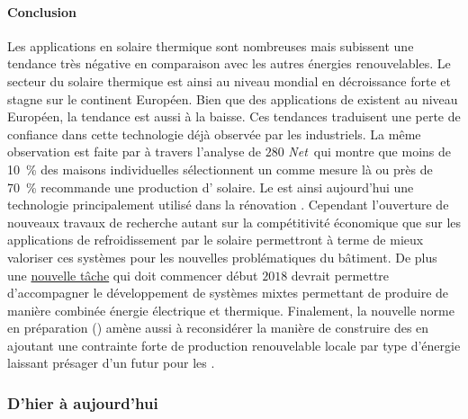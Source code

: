 \paragraph{Conclusion} %
\label{par:conclusion}
Les applications en solaire thermique sont nombreuses mais subissent
une tendance très négative en comparaison avec les autres énergies renouvelables. Le
secteur du solaire thermique est ainsi au niveau mondial en décroissance forte et stagne
sur le continent Européen. Bien que des applications de  existent au niveau
Européen, la tendance est aussi à la baisse. Ces tendances traduisent une perte de
confiance dans cette technologie déjà observée par les industriels. La même observation
est faite par \textcite{Musall2010} à travers l’analyse de $280$ \textit{Net}\, qui
montre que moins de \SI{10}{\percent} des maisons individuelles sélectionnent un 
comme mesure là ou près de \SI{70}{\percent} recommande une production d’
solaire. Le  est ainsi aujourd’hui une technologie principalement utilisé dans la rénovation
\parencite{Ellehauge2003}. Cependant l’ouverture de nouveaux travaux de recherche
autant sur la compétitivité économique que sur les applications de refroidissement
par le solaire permettront à terme de mieux valoriser ces systèmes pour les nouvelles
problématiques du bâtiment.
De plus une \href{http://www.iea-shc.org/article?NewsID=173}{nouvelle tâche} qui doit
commencer début $2018$ devrait permettre d’accompagner le développement de systèmes mixtes
permettant de produire de manière combinée énergie électrique et thermique. Finalement, la
nouvelle norme en préparation () amène aussi à reconsidérer la manière
de construire des  en ajoutant une contrainte forte de production renouvelable
locale par type d’énergie laissant présager d’un futur pour les .


\subsubsection{D’hier à aujourd’hui} %
\label{ssub:d_hier_a_aujourd_hui}

